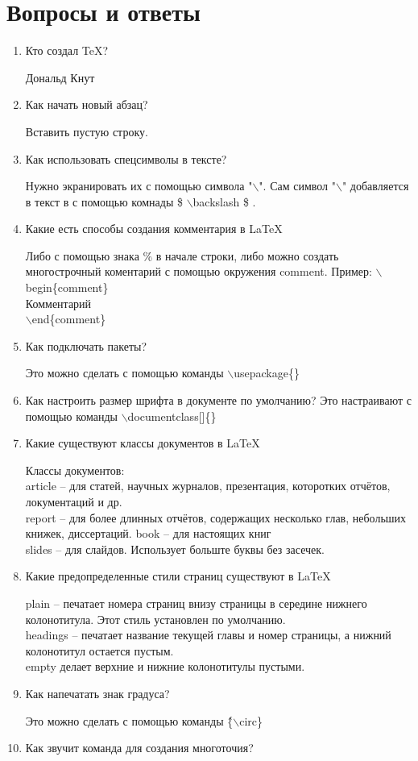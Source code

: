 \documentclass[a4paper,12pt]{article} %
\begin{document}
\section{Вопросы и ответы}
\begin{enumerate}
\item Кто создал \TeX{}?

Дональд Кнут
\item Как начать новый абзац?

Вставить пустую строку.
\item Как использовать спецсимволы в тексте?

Нужно экранировать их с помощью символа "$\backslash$". Сам символ "$\backslash$" добавляется в текст в с помощью комнады \$ $\backslash$backslash \$ .

\item Какие есть способы создания комментария в \LaTeX{}

Либо с помощью знака \% в начале строки, либо можно создать многострочный коментарий с помощью окружения comment. Пример: $\backslash$begin\{comment\} \\
Комментарий \\
$\backslash$end\{comment\}
\item Как подключать пакеты?

Это можно сделать с помощью команды $\backslash$usepackage\{\}
\item Как настроить размер шрифта в документе по умолчанию?
Это настраивают с помощью команды $\backslash$documentclass[]\{\}

\item Какие существуют классы документов в \LaTeX{}

Классы документов:\\
article -- для статей, научных журналов, презентация, которотких отчётов, локументаций и др.\\
report -- для более длинных отчётов, содержащих несколько глав, небольших книжек, диссертаций.
book -- для настоящих книг\\
slides -- для слайдов. Использует больште буквы без засечек.

\item Какие предопределенные стили страниц существуют в \LaTeX{}

plain -- печатает номера страниц внизу страницы в середине нижнего колонотитула. Этот стиль установлен по умолчанию.\\
headings -- печатает название текущей главы и номер страницы, а нижний колонотитул остается пустым.\\
empty делает верхние и нижние колонотитулы пустыми.
\item Как напечатать знак градуса?

Это можно сделать с помощью команды  \^\{$\backslash$circ\}
\item Как звучит команда для создания многоточия?

\end{enumerate}
\end{document}
